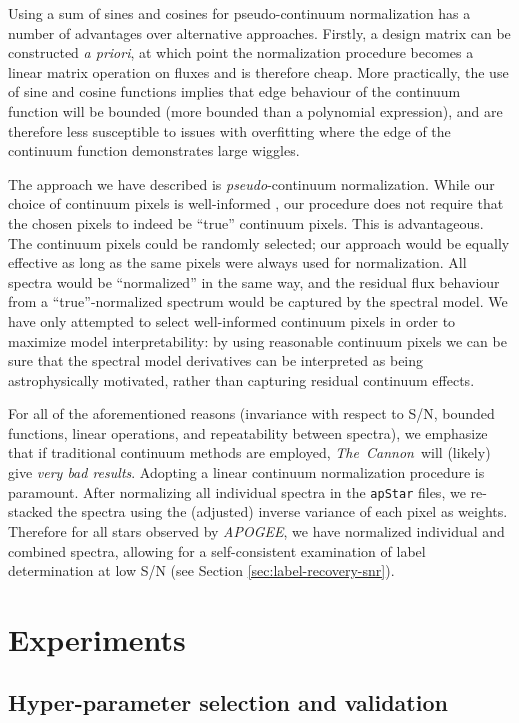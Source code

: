 \documentclass[12pt,preprint]{aastex}
\newcommand{\project}[1]{\textsl{#1}}
\newcommand{\TheCannon}{\project{The~Cannon}}
\newcommand{\acronym}[1]{{\small{#1}}}
\newcommand{\apogee}{\project{\acronym{APOGEE}}}
\begin{document}
Using a sum of sines and cosines for pseudo-continuum normalization has a number
of advantages over alternative approaches.  Firstly, a design matrix can be
constructed \emph{a priori}, at which point the normalization procedure becomes a
linear matrix operation on fluxes and is therefore cheap.  More practically, 
the use of sine and cosine functions implies that edge behaviour of the 
continuum function will be bounded (more bounded than a polynomial expression),
and are therefore less susceptible to issues with overfitting where the edge of
the continuum function demonstrates large wiggles.


The approach we have described is \emph{pseudo}-continuum normalization.  While 
our choice of continuum pixels is well-informed \citep{tc}, our 
procedure does not require that the chosen pixels to indeed be ``true'' continuum
pixels.  This is advantageous.  The continuum pixels could be randomly selected; 
our approach would be equally effective as long as the same pixels were always
used for normalization.  All spectra would be ``normalized'' in the same way, and
the residual flux behaviour from a ``true''-normalized spectrum would be captured 
by the spectral model.  We have only attempted to select well-informed continuum
pixels in order to maximize model interpretability: by using reasonable 
continuum pixels we can be sure that the spectral model derivatives can be 
interpreted as being astrophysically motivated, rather than capturing residual 
continuum effects.


For all of the aforementioned reasons (invariance with respect to S/N, bounded
functions, linear operations, and repeatability between spectra), we emphasize
that if traditional continuum methods are employed, \TheCannon\ will (likely) 
give \emph{very bad results}.  Adopting a linear continuum normalization 
procedure is paramount.  After normalizing all individual spectra in the
\texttt{apStar} files, we re-stacked the spectra using the (adjusted) inverse
variance of each pixel as weights.  Therefore for all stars observed by \apogee,
we have normalized individual and combined spectra, allowing for a 
self-consistent examination of label determination at low S/N (see Section
\ref{sec:label-recovery-snr}).


\section{Experiments}
\label{sec:experiments}


\subsection{Hyper-parameter selection and validation}
\label{sec:hyper-parameter-validation}
\end{document}
